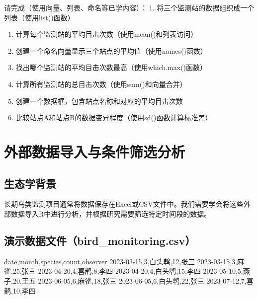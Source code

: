 \documentclass[
  twoside]{book}
\newenvironment{Shaded}{\begin{snugshade}}{\end{snugshade}}
\newcommand{\NormalTok}[1]{#1}
\begin{document}
请完成（使用向量、列表、命名等已学内容）：
1. 将三个监测站的数据组织成一个列表（使用list()函数）

\begin{enumerate}
\def\labelenumi{\arabic{enumi}.}
\setcounter{enumi}{1}
\item
  计算每个监测站的平均目击次数（使用mean()和列表访问）
\item
  创建一个命名向量显示三个站点的平均值（使用names()函数）
\item
  找出哪个监测站的平均目击次数最高（使用which.max()函数）
\item
  计算所有监测站的总目击次数（使用sum()和向量合并）
\item
  创建一个数据框，包含站点名称和对应的平均目击次数
\item
  比较站点A和站点B的数据变异程度（使用sd()函数计算标准差）
\end{enumerate}

\hypertarget{ux5916ux90e8ux6570ux636eux5bfcux5165ux4e0eux6761ux4ef6ux7b5bux9009ux5206ux6790}{%
\section{外部数据导入与条件筛选分析}\label{ux5916ux90e8ux6570ux636eux5bfcux5165ux4e0eux6761ux4ef6ux7b5bux9009ux5206ux6790}}

\hypertarget{ux751fux6001ux5b66ux80ccux666f-4}{%
\subsection{生态学背景}\label{ux751fux6001ux5b66ux80ccux666f-4}}

长期鸟类监测项目通常将数据保存在Excel或CSV文件中。我们需要学会将这些外部数据导入R中进行分析，并根据研究需要筛选特定时间段的数据。

\hypertarget{ux6f14ux793aux6570ux636eux6587ux4ef6bird_monitoring.csv}{%
\subsection{演示数据文件（bird\_monitoring.csv）}\label{ux6f14ux793aux6570ux636eux6587ux4ef6bird_monitoring.csv}}

\begin{Shaded}
\begin{Highlighting}[]
\NormalTok{date,month,species,count,observer}
\NormalTok{2023{-}03{-}15,3,白头鹎,12,张三}
\NormalTok{2023{-}03{-}15,3,麻雀,25,张三}
\NormalTok{2023{-}04{-}20,4,喜鹊,8,李四}
\NormalTok{2023{-}04{-}20,4,白头鹎,15,李四}
\NormalTok{2023{-}05{-}10,5,燕子,20,王五}
\NormalTok{2023{-}06{-}05,6,麻雀,18,张三}
\NormalTok{2023{-}06{-}05,6,白头鹎,22,张三}
\NormalTok{2023{-}07{-}12,7,喜鹊,10,李四}
\end{Highlighting}
\end{Shaded}
\end{document}
